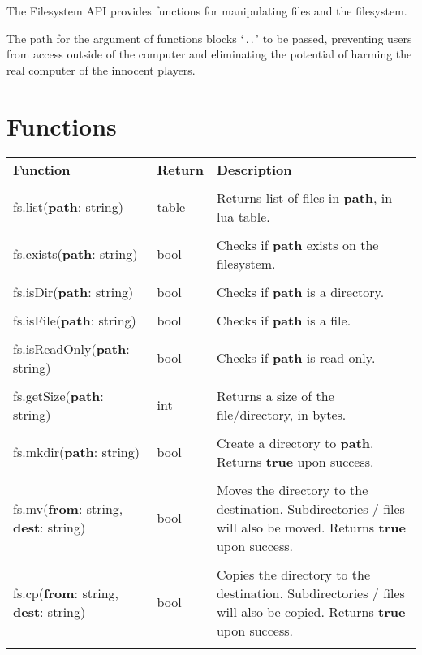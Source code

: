 The Filesystem API provides functions for manipulating files and the filesystem.

The path for the argument of functions blocks `\,.\,.\,' to be passed, preventing users from access outside of the computer and eliminating the potential of harming the real computer of the innocent players.

\section{Functions}

\begin{tabularx}{\textwidth}{l l X}
	\textbf{\large Function} & \textbf{\large Return} & \textbf{\large Description}
	\\ \\
	\endhead
	fs.list(\textbf{path}: string) & table & Returns list of files in \textbf{path}, in lua table.
	\\ \\
	fs.exists(\textbf{path}: string) & bool & Checks if \textbf{path} exists on the filesystem.
	\\ \\
	fs.isDir(\textbf{path}: string) & bool & Checks if \textbf{path} is a directory.
	\\ \\
	fs.isFile(\textbf{path}: string) & bool & Checks if \textbf{path} is a file.
	\\ \\
	fs.isReadOnly(\textbf{path}: string) & bool & Checks if \textbf{path} is read only.
	\\ \\
	fs.getSize(\textbf{path}: string) & int & Returns a size of the file/directory, in bytes.
	\\ \\
	fs.mkdir(\textbf{path}: string) & bool & Create a directory to \textbf{path}. Returns \textbf{true} upon success.
	\\ \\
	fs.mv(\textbf{from}: string, \textbf{dest}: string) & bool & Moves the directory to the destination. Subdirectories / files will also be moved. Returns \textbf{true} upon success.
	\\ \\
	fs.cp(\textbf{from}: string, \textbf{dest}: string) & bool & Copies the directory to the destination. Subdirectories / files will also be copied. Returns \textbf{true} upon success.
	\\ \\

\end{tabularx}
